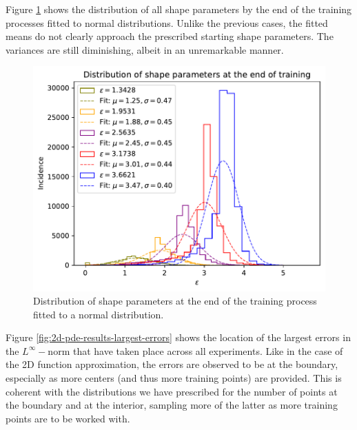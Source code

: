 \documentclass[12pt]{report} %
\begin{document}
Figure \ref{fig:2d-pde-results-shape-parameters} shows the distribution of all shape parameters by the end of the training processes fitted to normal distributions. Unlike the previous cases, the fitted means do not clearly approach the prescribed starting shape parameters. The variances are still diminishing, albeit in an unremarkable manner.

\begin{figure}[h]
  \includegraphics[width=.8\textwidth]{imagenes/experiments/2d/pde_parabola/distribution_of_shape_parameters_at_end_of_training.pdf}
  \caption{Distribution of shape parameters at the end of the training process fitted to a normal distribution.}
  \label{fig:2d-pde-results-shape-parameters}
\end{figure}

Figure \ref{fig:2d-pde-results-largest-errors} shows the location of the largest errors in the $L^\infty-$norm that have taken place across all experiments. Like in the case of the 2D function approximation, the errors are observed to be at the boundary, especially as more centers (and thus more training points) are provided. This is coherent with the distributions we have prescribed for the number of points at the boundary and at the interior, sampling more of the latter as more training points are to be worked with.
\end{document}
